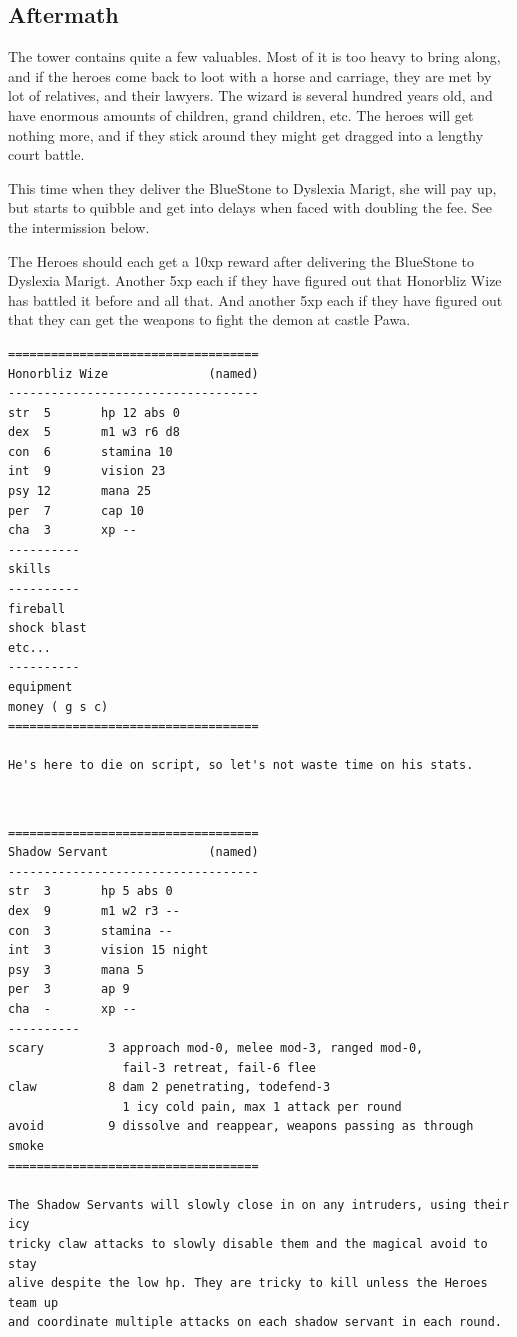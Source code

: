 \subsection*{Aftermath}
The tower contains quite a few valuables. Most of it is too heavy to bring along, and if the heroes come back to loot with a horse and carriage, they are met by lot of relatives, and their lawyers. The wizard is several hundred years old, and have enormous amounts of children, grand children, etc. The heroes will get nothing more, and if they stick around they might get dragged into a lengthy court battle.

This time when they deliver the BlueStone to Dyslexia Marigt, she will pay up, but starts to quibble and get into delays when faced with doubling the fee. See the intermission below.

The Heroes should each get a 10xp reward after delivering the BlueStone to Dyslexia Marigt. Another 5xp each if they have figured out that Honorbliz Wize has battled it before and all that. And another 5xp each if they have figured out that they can get the weapons to fight the demon at castle Pawa.


\raggedbottom

\goodbreak \begin{samepage} \vsmall \begin{verbatim}
===================================
Honorbliz Wize              (named)
-----------------------------------
str  5       hp 12 abs 0
dex  5       m1 w3 r6 d8
con  6       stamina 10
int  9       vision 23
psy 12       mana 25
per  7       cap 10
cha  3       xp --
----------
skills
----------
fireball
shock blast
etc...
----------
equipment
money ( g s c)
===================================

He's here to die on script, so let's not waste time on his stats.
\end{verbatim} \normalsize \end{samepage}

\

\goodbreak \begin{samepage} \vsmall \begin{verbatim}
===================================
Shadow Servant              (named)
-----------------------------------
str  3       hp 5 abs 0
dex  9       m1 w2 r3 --
con  3       stamina --
int  3       vision 15 night
psy  3       mana 5
per  3       ap 9
cha  -       xp --
----------
scary         3 approach mod-0, melee mod-3, ranged mod-0,
                fail-3 retreat, fail-6 flee
claw          8 dam 2 penetrating, todefend-3
                1 icy cold pain, max 1 attack per round
avoid         9 dissolve and reappear, weapons passing as through smoke
===================================

The Shadow Servants will slowly close in on any intruders, using their icy
tricky claw attacks to slowly disable them and the magical avoid to stay
alive despite the low hp. They are tricky to kill unless the Heroes team up
and coordinate multiple attacks on each shadow servant in each round.
\end{verbatim} \normalsize \end{samepage}

